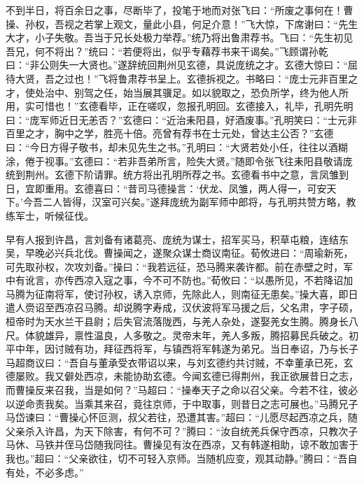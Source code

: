 不到半日，将百余日之事，尽断毕了，投笔于地而对张飞曰：“所废之事何在！曹操、孙权，吾视之若掌上观文，量此小县，何足介意！”飞大惊，下席谢曰：“先生大才，小子失敬。吾当于兄长处极力举荐。”统乃将出鲁肃荐书。飞曰：“先生初见吾兄，何不将出？”统曰：“若便将出，似乎专藉荐书来干谒矣。”飞顾谓孙乾曰：“非公则失一大贤也。”遂辞统回荆州见玄德，具说庞统之才。玄德大惊曰：“屈待大贤，吾之过也！”飞将鲁肃荐书呈上。玄德拆视之。书略曰：“庞士元非百里之才，使处治中、别驾之任，始当展其骥足。如以貌取之，恐负所学，终为他人所用，实可惜也！”玄德看毕，正在嗟叹，忽报孔明回。玄德接入，礼毕，孔明先明曰：“庞军师近日无恙否？”玄德曰：“近治耒阳县，好酒废事。”孔明笑曰：“士元非百里之才，胸中之学，胜亮十倍。亮曾有荐书在士元处，曾达主公否？”玄德曰：“今日方得子敬书，却未见先生之书。”孔明曰：“大贤若处小任，往往以酒糊涂，倦于视事。”玄德曰：“若非吾弟所言，险失大贤。”随即令张飞往耒阳县敬请庞统到荆州。玄德下阶请罪。统方将出孔明所荐之书。玄德看书中之意，言凤雏到日，宜即重用。玄德喜曰：“昔司马德操言：‘伏龙、凤雏，两人得一，可安天下。’今吾二人皆得，汉室可兴矣。”遂拜庞统为副军师中郎将，与孔明共赞方略，教练军士，听候征伐。

早有人报到许昌，言刘备有诸葛亮、庞统为谋士，招军买马，积草屯粮，连结东吴，早晚必兴兵北伐。曹操闻之，遂聚众谋士商议南征。荀攸进曰：“周瑜新死，可先取孙权，次攻刘备。”操曰：“我若远征，恐马腾来袭许都。前在赤壁之时，军中有讹言，亦传西凉入寇之事，今不可不防也。”荀攸曰：“以愚所见，不若降诏加马腾为征南将军，使讨孙权，诱入京师，先除此人，则南征无患矣。”操大喜，即日遣人赍诏至西凉召马腾。却说腾字寿成，汉伏波将军马援之后，父名肃，字子硕，桓帝时为天水兰干县尉；后失官流落陇西，与羌人杂处，遂娶羌女生腾。腾身长八尺。体貌雄异，禀性温良，人多敬之。灵帝末年，羌人多叛，腾招募民兵破之。初平中年，因讨贼有功，拜征西将军，与镇西将军韩遂为弟兄。当日奉诏，乃与长子马超商议曰：“吾自与董承受衣带诏以来，与刘玄德约共讨贼，不幸董承已死，玄德屡败。我又僻处西凉，未能协助玄德。今闻玄德已得荆州，我正欲展昔日之志，而曹操反来召我，当是如何？”马超曰：“操奉天子之命以召父亲。今若不往，彼必以逆命责我矣。当乘其来召，竟往京师，于中取事，则昔日之志可展也。”马腾兄子马岱谏曰：“曹操心怀叵测，叔父若往，恐遭其害。”超曰：“儿愿尽起西凉之兵，随父亲杀入许昌，为天下除害，有何不可？”腾曰：“汝自统羌兵保守西凉，只教次子马休、马铁并侄马岱随我同往。曹操见有汝在西凉，又有韩遂相助，谅不敢加害于我也。”超曰：“父亲欲往，切不可轻入京师。当随机应变，观其动静。”腾曰：“吾自有处，不必多虑。”

